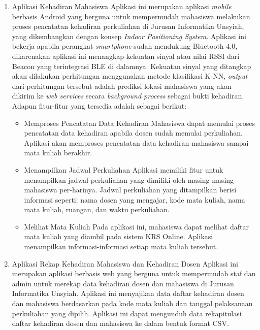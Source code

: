 \begin{enumerate}
\begin {itemize}
\end{itemize}

\item Aplikasi Kehadiran Mahasiswa
\newline
Aplikasi ini merupakan aplikasi \textit{mobile} berbasis Android yang berguna untuk mempermudah mahasiswa melakukan proses pencatatan kehadiran perkuliahan di Jurusan Informatika Unsyiah, yang dikembangkan dengan konsep \textit{Indoor Positioning System}. Aplikasi ini bekerja apabila perangkat \textit{smartphone} sudah mendukung Bluetooth 4.0, dikarenakan aplikasi ini menangkap kekuatan sinyal atau nilai RSSI dari Beacon yang terintegrasi BLE di dalamnya. Kekuatan sinyal yang ditangkap akan dilakukan perhitungan menggunakan metode klasifikasi K-NN, \textit{output} dari perhitungan tersebut adalah prediksi lokasi mahasiswa yang akan dikirim ke \textit{web services} secara \textit{background process} sebagai bukti kehadiran. Adapun fitur-fitur yang tersedia adalah sebagai berikut:
 
\begin {itemize}
\itemsep0em
\item Memproses Pencatatan Data Kehadiran \newline
Mahasiswa dapat memulai proses pencatatan data kehadiran apabila dosen sudah memulai perkuliahan. Aplikasi akan memproses pencatatan data kehadiran mahasiswa sampai mata kuliah berakhir.

\item Menampilkan Jadwal Perkuliahan \newline
Aplikasi memiliki fitur untuk menampilkan jadwal perkuliahan yang dimiliki oleh masing-masing mahasiswa per-harinya. Jadwal perkuliahan yang ditampilkan berisi informasi seperti: nama dosen yang mengajar, kode mata kuliah, nama mata kuliah, ruangan, dan waktu perkuliahan.

\item Melihat Mata Kuliah \newline
Pada aplikasi ini, mahasiswa dapat melihat daftar mata kuliah yang diambil pada sistem KRS Online. Aplikasi menampilkan informasi-informasi setiap mata kuliah tersebut.
\end{itemize}

\item Aplikasi Rekap Kehadiran Mahasiswa dan Kehadiran Dosen
\newline
Aplikasi ini merupakan aplikasi berbasis web yang berguna untuk mempermudah staf dan admin untuk merekap data kehadiran dosen dan mahasiswa di Jurusan Informatika Unsyiah. Aplikasi ini menyajikan data daftar kehadiran dosen dan mahasiswa berdasarkan pada kode mata kuliah dan tanggal pelaksanaan perkuliahan yang dipilih. Aplikasi ini dapat mengunduh data rekapitulasi daftar kehadiran dosen dan mahasiswa ke dalam bentuk format CSV. 

\end{enumerate}
